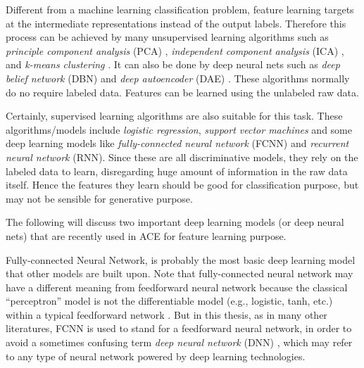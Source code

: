 Different from a machine learning classification problem, feature learning targets at the intermediate representations instead of the output labels. Therefore this process can be achieved by many unsupervised learning algorithms such as {\it principle component analysis} (PCA) \cite{jolliffe2002principal}, {\it independent component analysis} (ICA) \cite{hyvarinen2004independent}, and {\it k-means clustering} \cite{macqueen1967some}. It can also be done by deep neural nets such as {\it deep belief network} (DBN) \cite{hinton2006fast} and {\it deep autoencoder} (DAE) \cite{bengio2009learning}. These algorithms normally do no require labeled data. Features can be learned using the unlabeled raw data.

Certainly, supervised learning algorithms are also suitable for this task. These algorithms/models include {\it logistic regression}, {\it support vector machines} and some deep learning models like {\it fully-connected neural network} (FCNN) and {\it recurrent neural network} (RNN). Since these are all discriminative models, they rely on the labeled data to learn, disregarding huge amount of information in the raw data itself. Hence the features they learn should be good for classification purpose, but may not be sensible for generative purpose.

The following will discuss two important deep learning models (or deep neural nets) that are recently used in ACE for feature learning purpose.

Fully-connected Neural Network, is probably the most basic deep learning model that other models are built upon. Note that fully-connected neural network may have a different meaning from feedforward neural network because the classical ``perceptron'' model \cite{rosenblatt1958perceptron} is not the differentiable model (e.g., logistic, tanh, etc.) within a typical feedforward network \cite{rumelhart1988parallel}. But in this thesis, as in many other literatures, FCNN is used to stand for a feedforward neural network, in order to avoid a sometimes confusing term {\it deep neural network} (DNN) \cite{deng2014deep}, which may refer to any type of neural network powered by deep learning technologies.

